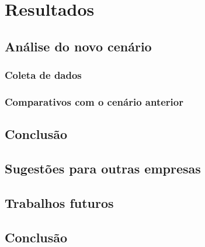 \documentclass[
	12pt,				%
	openright,			%
	twoside,			%
	a4paper,			%
	english,			%
	french,				%
	spanish,			%
	brazil,				%
	]{abntex2}
\begin{document}




\part{Resultados}

\chapter{Análise do novo cenário}

\section{Coleta de dados}

\section{Comparativos com o cenário anterior}

\chapter{Conclusão}

\chapter{Sugestões para outras empresas}

\chapter{Trabalhos futuros}

\lipsum[1]

\lipsum[2-3]


\chapter{Conclusão}
\end{document}
